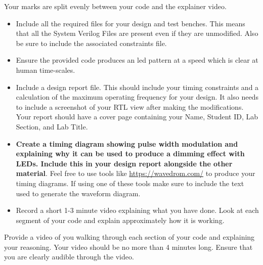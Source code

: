 Your marks are split evenly between your code and the explainer video.\\
\begin{itemize}
    \item Include all the required files for your design and test benches. This means that all the System Verilog Files are present even if they are unmodified. Also be sure to include the associated constraints file.
    \item Ensure the provided code produces an led pattern at a speed which is clear at human time-scales. 
    \item Include a design report file. This should include your timing constraints and a calculation of the maximum operating frequency for your design. It also needs to include a screenshot of your RTL view after making the modifications. Your report should have a cover page containing your Name, Student ID, Lab Section, and Lab Title. 
    \item \textbf{Create a timing diagram showing pulse width modulation and explaining why it can be used to produce a dimming effect with LEDs. Include this in your design report alongside the other material}. Feel free to use tools like  \url{https://wavedrom.com/} to produce your timing diagrams. If using one of these tools make sure to include the text used to generate the waveform diagram. 
    \item Record a short 1-3 minute video explaining what you have done. Look at each segment of your code and explain approximately how it is working. 
\end{itemize}

\vspace{0.5cm}
Provide a video of you walking through each section of your code and explaining your reasoning. Your video should be no more than 4 minutes long. Ensure that you are clearly audible through the video. 